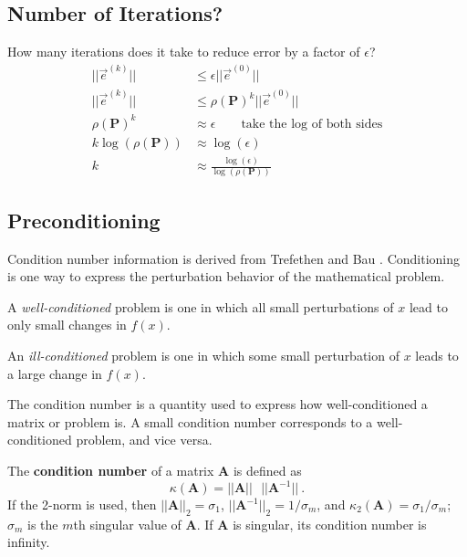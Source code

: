 \documentclass[12pt]{article}
\newcommand{\ve}[1]{\ensuremath{\mathbf{#1}}}
\begin{document}
\subsection*{Number of Iterations?}

How many iterations does it take to reduce error by a factor of $\epsilon$? 
%
\begin{align}
|| \vec{e}^{(k)} || &\leq \epsilon || \vec{e}^{(0)} || \nonumber \\
%
|| \vec{e}^{(k)} || &\leq \rho(\ve{P})^k || \vec{e}^{(0)} || \nonumber \\
%
\rho(\ve{P})^k &\approx \epsilon 
\qquad \text{take the log of both sides}\nonumber \\
%
k \log(\rho(\ve{P})) &\approx \log(\epsilon)\nonumber \\
%
k &\approx \frac{\log(\epsilon)}{\log(\rho(\ve{P}))} \nonumber
\end{align}

\subsection*{Preconditioning}
Condition number information is derived from Trefethen and Bau \cite{Trefethen1997}. Conditioning is one way to express the perturbation behavior of the mathematical problem. 

A \emph{well-conditioned} problem is one in which all small perturbations of $x$ lead to only small changes in $f(x)$. 

An \emph{ill-conditioned} problem is one in which some small perturbation of $x$ leads to a large change in $f(x)$. 

The condition number is a quantity used to express how well-conditioned a matrix or problem is. A small condition number corresponds to a well-conditioned problem, and vice versa. 

The \textbf{condition number} of a matrix $\mathbf{A}$ is defined as
\[\kappa(\mathbf{A}) = ||\mathbf{A}|| \text{ }||\mathbf{A}^{-1}|| \:.
\]
%
If the 2-norm is used, then $||\mathbf{A}||_{2} = \sigma_{1}$, $||\mathbf{A}^{-1}||_{2} = 1 / \sigma_{m}$, and $\kappa_{2}(\mathbf{A}) = \sigma_{1} / \sigma_{m}$; $\sigma_{m}$ is the $m$th singular value of $\ve{A}$. If $\mathbf{A}$ is singular, its condition number is infinity. 
\end{document}
